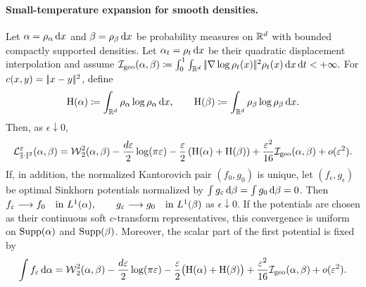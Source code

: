 \paragraph{Small-temperature expansion for smooth densities.}
\begin{prop}\label{prop-small-epsilon-expansion}
Let $\alpha=\rho_{\alpha}\,\mathrm{d} x$ and $\beta=\rho_{\beta}\,\mathrm{d} x$ be probability measures on $\mathbb{R}^d$ with bounded compactly supported densities. Let $\alpha_t=\rho_t\,\mathrm{d} x$ be their quadratic displacement interpolation and assume
\(\mathcal I_{\rm geo}(\alpha,\beta)\coloneqq \int_0^1\int_{\mathbb{R}^d} |\!| \nabla\log\rho_t(x) |\!|^2\rho_t(x)\,\mathrm{d} x\,\mathrm{d} t<+\infty.\)
For $c(x,y)=|\!| x-y |\!|^2$, define
\[
\mathrm H(\alpha)\coloneqq\int_{\mathbb{R}^d}\rho_{\alpha}\log\rho_{\alpha}\,\mathrm{d} x,
\qquad
\mathrm H(\beta)\coloneqq\int_{\mathbb{R}^d}\rho_{\beta}\log\rho_{\beta}\,\mathrm{d} x.
\]
Then, as $\epsilon\downarrow0$,
\[
\mathcal{L}_{|\!| \cdot |\!|^2}^{\varepsilon}(\alpha,\beta)
=
\operatorname{\mathcal{W}}_2^2(\alpha,\beta)
-\frac{d\varepsilon}{2}\log(\pi\varepsilon)
-\frac{\varepsilon}{2}\left( \mathrm H(\alpha)+\mathrm H(\beta) \right)
+\frac{\varepsilon^2}{16}\mathcal I_{\rm geo}(\alpha,\beta)
+o(\varepsilon^2).
\]
If, in addition, the normalized Kantorovich pair $(f_0,g_0)$ is unique, let $(f_\epsilon,g_\epsilon)$ be optimal Sinkhorn potentials normalized by $\int g_\varepsilon\,\mathrm{d}\beta=\int g_0\,\mathrm{d}\beta=0$. Then
\(f_\varepsilon\longrightarrow f_0\quad\text{in }L^1(\alpha), \qquad g_\varepsilon\longrightarrow g_0\quad\text{in }L^1(\beta)\)
as $\epsilon\downarrow0$. If the potentials are chosen as their continuous soft $c$-transform representatives, this convergence is uniform on $\operatorname{Supp}(\alpha)$ and $\operatorname{Supp}(\beta)$. Moreover, the scalar part of the first potential is fixed by
\[
\int f_\varepsilon\,\mathrm{d}\alpha
=
\operatorname{\mathcal{W}}_2^2(\alpha,\beta)
-\frac{d\varepsilon}{2}\log(\pi\varepsilon)
-\frac{\varepsilon}{2}\bigl(\mathrm H(\alpha)+\mathrm H(\beta)\bigr)
+\frac{\varepsilon^2}{16}\mathcal I_{\rm geo}(\alpha,\beta)
+o(\varepsilon^2).
\]
\end{prop}
